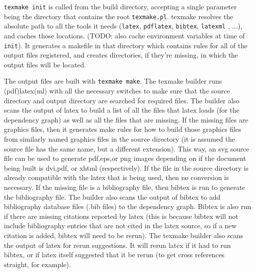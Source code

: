 \verb|texmake init| is called from the build directory, accepting a single parameter being the directory that contains the root \verb|texmake.pl|. 
%
texmake resolves the absolute path to all the tools it needs (\verb|latex|, \verb|pdflatex|, \verb|bibtex|, \verb|latexml| \cite{millerLatexml}, ...), and caches those locations. 
%
(TODO: also cache environment variables at time of \verb|init|). 
%
It generates a makefile in that directory which contains rules for all of the output files registered, and creates directories, if they're missing, in which the output files will be located. 

The output files are built with \verb|texmake make|. The texmake builder runs (pdf)latex(ml) with all the necessary switches to make sure that the source directory and output directory are searched for required files. 
%
The builder also scans the output of latex to build a list of all the files that latex loads (for the dependency graph) as well as all the files that are missing. 
%
If the missing files are graphics files, then it generates make rules for how to build those graphics files from similarly named graphics files in the source directory (it is assumed the source file has the same name, but a different extension). 
%
This way, an svg source file can be used to generate pdf,eps,or png images depending on if the document being built is dvi,pdf, or xhtml (respectively). 
%
If the file in the source directory is already compatible with the latex that is being used, then no conversion is necessary. 
%
If the missing file is a bibliography file, then bibtex is run to generate the bibliography file. 
%
The builder also scans the output of bibtex to add bibliography database files (.bib files) to the dependency graph. 
%
Bibtex is also run if there are missing citations reported by latex (this is because bibtex will not include bibliography entries that are not cited in the latex source, so if a new citation is added, bibtex will need to be rerun). 
%
The texmake builder also scans the output of latex for rerun suggestions. 
%
It will rerun latex if it had to run bibtex, or if latex itself suggested that it be rerun (to get cross references straight, for example).




